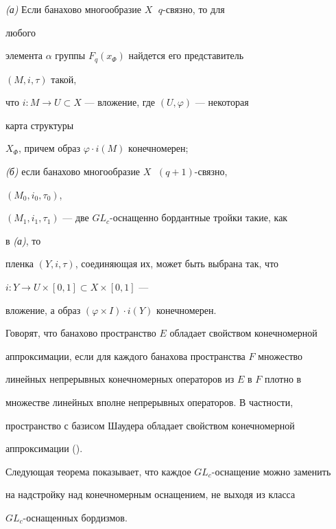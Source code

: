 \begin{thm} {\em (а)} Если банахово многообразие $X\;$ $q$-связно, то для 


любого 


элемента $\alpha$ группы $F_q(x_\Phi)$ найдется его представитель 


$(M,i,\tau)$ такой, 


что $i:M\to U\subset X$ --- вложение, где $(U,\varphi)$ --- некоторая 


карта структуры 


$X_\Phi$, причем образ $\varphi\cdot i(M)$ конечномерен; 


 


{\em (б)} если банахово многообразие $X\;$ $(q+1)$-связно, 


$(M_0,i_0,\tau_0)$, 


$(M_1,i_1,\tau_1)$ --- две $GL_c$-оснащенно бордантные тройки такие, как 


в {\em (а)}, то 


пленка $(Y,i,\tau)$, соединяющая их, может быть выбрана так, что 


$i:Y\to U\times[0,1]\subset X\times[0,1]$ ---


вложение, а образ $(\varphi\times I)\cdot i(Y)$ конечномерен. 


\end{thm} 


 


Говорят, что банахово пространство $E$ обладает свойством конечномерной 


аппроксимации, если для каждого банахова пространства $F$ множество 


линейных непрерывных конечномерных операторов из $E$ в $F$ плотно в 


множестве линейных вполне непрерывных операторов. В частности, 


пространство с базисом Шаудера обладает свойством конечномерной 


аппроксимации (\cite{Lin}). 


 


Следующая теорема показывает, что каждое $GL_c$-оснащение можно заменить 


на надстройку над конечномерным оснащением, не выходя из класса 


$GL_c$-оснащенных бордизмов. 


 


